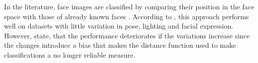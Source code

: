 In the literature, face images are classified by comparing their position in the face space with those of already known faces \cite{eigenfaces1991}.
According to \cite{eigenfaces1991}, this approach performs well on datasets with little variation in pose, lighting and facial expression.
However,  state, that the performance deteriorates if the variations increase since the changes introduce a bias 
that makes the distance function used to make classifications a no longer reliable measure.